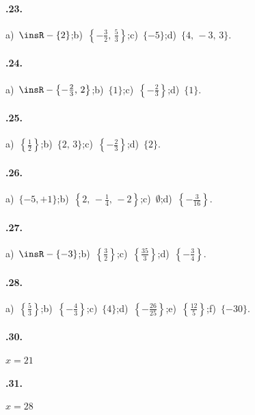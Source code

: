 \begin{multicols}{2}
\paragraph{\thechapter.23.}
a)~$\insR-\{2\}$;\quad b)~$\left\{-{\frac{3}{2}}\text{,~}\frac{5}{3}\right\}$;\quad c)~$\{-5\}$;\quad d)~$\{4\text{,~}-3\text{,~}3\}$.

\paragraph{\thechapter.24.}
a)~$\insR-\left\{-{\frac{2}{3}}\text{,~}2\right\}$;\quad b)~$\{1\}$;\quad c)~$\left\{-{\frac{2}{3}}\right\}$;\quad d)~$\{1\}$.

\paragraph{\thechapter.25.}
a)~$\left\{\frac{1}{2}\right\}$;\quad b)~$\{2\text{,~}3\}$;\quad c)~$\left\{-\frac{2}{3}\right\}$;\quad d)~$\{2\}$.

\paragraph{\thechapter.26.}
a)~$\{-5,+1\}$;\quad b)~$\left\{2\text{,~}-\frac{1}{4}\text{,~}-2\right\}$;\quad c)~$\emptyset$;\quad d)~$\left\{-{\frac{3}{16}}\right\}$.

\paragraph{\thechapter.27.}
a)~$\insR-\{-3\}$;\quad b)~$\left\{\frac{3}{2}\right\}$;\quad c)~$\left\{\frac{35}{3}\right\}$;\quad d)~$\left\{-{\frac{3}{4}}\right\}$.

\paragraph{\thechapter.28.}
a)~$\left\{\frac{5}{3}\right\}$;\quad b)~$\left\{-\frac{4}{3}\right\}$;\quad c)~$\{4\}$;\quad d)~$\left\{-{\frac{26}{25}}\right\}$;\quad e)~$\left\{\frac{12}{5}\right\}$;\quad f)~$\{-30\}$.

\paragraph{\thechapter.30.} $x=21$

\paragraph{\thechapter.31.} $x=28$
\end{multicols}
